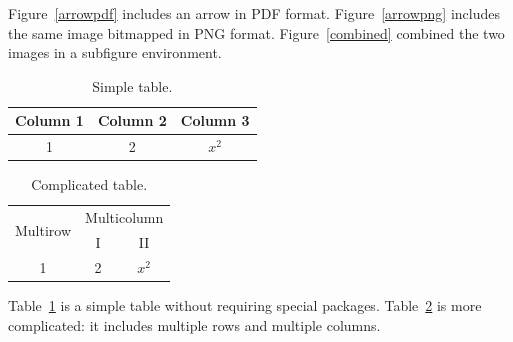\documentclass{article}
\begin{document}
Figure~\ref{arrowpdf} includes an arrow in PDF format. Figure~\ref{arrowpng} includes the same image bitmapped in PNG format. Figure~\ref{combined} combined the two images in a subfigure environment.

\begin{table}
\begin{center}
\begin{tabular}{c|c|c}
Column 1 & Column 2 & Column 3\\
\hline
1&2& $x^{2}$\\
\hline
\end{tabular}
\caption{Simple table.}
\label{simple}
\end{center}
\end{table}

\begin{table}
\begin{center}
\begin{tabular}{|c|c|c|}
\hline
\multirow{2}{*}{Multirow}&\multicolumn{2}{|c|}{Multicolumn}\\
\cline{2-3}
&I&II\\
\hline
1&2& $x^{2}$\\
\hline
\end{tabular}
\caption{Complicated table.}
\label{complicated}
\end{center}
\end{table}

Table~\ref{simple} is a simple table without requiring special packages. Table~\ref{complicated} is more complicated: it includes multiple rows and multiple columns.



\end{document}
